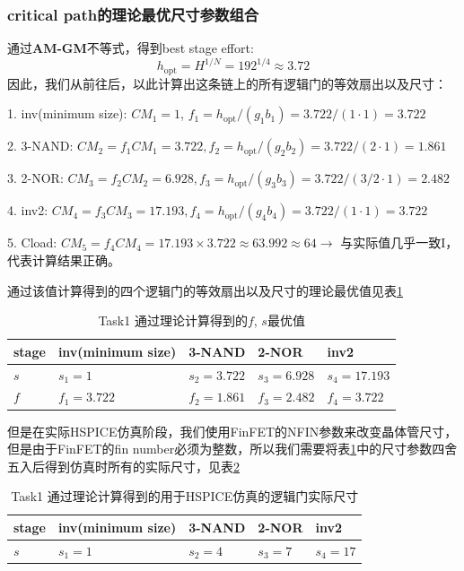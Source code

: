 \documentclass[UTF8,12pt,a4paper]{ctexart}
\begin{document}
\subsubsection{critical path的理论最优尺寸参数组合}

通过\textbf{AM-GM}不等式，得到best stage effort:
$$h_{\text{opt}} = H^{1/N} = 192^{1/4} \approx 3.72$$
因此，我们从前往后，以此计算出这条链上的所有逻辑门的等效扇出以及尺寸：

1. inv(minimum size): $CM_1 = 1$, $f_1 = h_{\text{opt}}/(g_1 b_1) = 3.722/(1 \cdot 1) = 3.722$

2. 3-NAND: $CM_2 = f_1 CM_1 = 3.722, f_2 = h_{\text{opt}}/(g_2 b_2) = 3.722/(2 \cdot 1) = 1.861$

3. 2-NOR: $CM_3 = f_2 CM_2 = 6.928, f_3 = h_{\text{opt}}/(g_3 b_3) = 3.722/(3/2 \cdot 1) = 2.482$

4. inv2: $CM_4 = f_3 CM_3 = 17.193, f_4 = h_{\text{opt}}/(g_4 b_4) = 3.722/(1 \cdot 1) = 3.722$

5. Cload: $CM_5 = f_4 CM_4 = 17.193 \times 3.722 \approx 63.992 \approx 64 \rightarrow $ 与实际值几乎一致I，代表计算结果正确。

通过该值计算得到的四个逻辑门的等效扇出以及尺寸的理论最优值见表\ref{tab:task1_theo_best_sf}
\begin{table}[htbp]
    \centering
    \caption{Task1 通过理论计算得到的$f$, $s$最优值}
    \label{tab:task1_theo_best_sf}
    \begin{tabularx}{\linewidth}{XXXXX}
    \toprule
    stage & inv(minimum size) & 3-NAND & 2-NOR & inv2 \\
    \midrule
    $s$ & $s_1 = 1$ & $s_2 = 3.722$ & $s_3 = 6.928$ & $s_4 = 17.193$ \\
    $f$ & $f_1 = 3.722$ & $f_2 = 1.861$ & $f_3 = 2.482$ & $f_4 = 3.722$ \\
    \bottomrule
    \end{tabularx}
\end{table}

但是在实际HSPICE仿真阶段，我们使用FinFET的NFIN参数来改变晶体管尺寸，但是由于FinFET的fin number必须为整数，所以我们需要将表\ref{tab:task1_theo_best_sf}中的尺寸参数四舍五入后得到仿真时所有的实际尺寸，见表\ref{tab:task1_theo_best_sf_spice}
\begin{table}[htbp]
    \centering
    \caption{Task1 通过理论计算得到的用于HSPICE仿真的逻辑门实际尺寸}
    \label{tab:task1_theo_best_sf_spice}
    \begin{tabularx}{\linewidth}{XXXXX}
    \toprule
    stage & inv(minimum size) & 3-NAND & 2-NOR & inv2 \\
    \midrule
    $s$ & $s_1 = 1$ & $s_2 = 4$ & $s_3 = 7$ & $s_4 = 17$ \\
    \bottomrule
    \end{tabularx}
\end{table}
\end{document}
